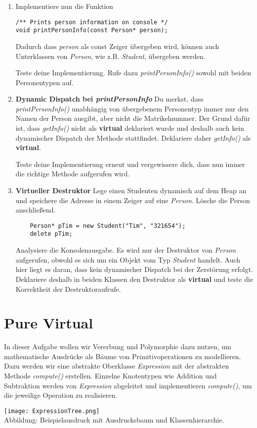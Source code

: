 \begin{enumerate}
\item
Implementiere nun die Funktion 
\begin{lstlisting}
/** Prints person information on console */
void printPersonInfo(const Person* person);
\end{lstlisting}

Dadurch dass \emph{person} als const Zeiger übergeben wird, können auch Unterklassen von \emph{Person}, wie z.B. \emph{Student}, übergeben werden. 

Teste deine Implementierung. 
Rufe dazu \emph{printPersonInfo()} sowohl mit beiden Personentypen auf.

\item \textbf{Dynamic Dispatch bei \emph{printPersonInfo}}
Du merkst, dass \emph{printPersonInfo()} unabhängig von übergebenem Personentyp immer nur den Namen der Person ausgibt, aber nicht die Matrikelnummer.
Der Grund dafür ist, dass \emph{getInfo()} nicht als \textbf{virtual} deklariert wurde und deshalb auch kein dynamischer Dispatch der Methode stattfindet.
Deklariere daher \emph{getInfo()} als \textbf{virtual}.

Teste deine Implementierung erneut und vergewissere dich, dass nun immer die richtige Methode aufgerufen wird.

\item \textbf{Virtueller Destruktor}
Lege einen Studenten dynamisch auf dem Heap an und speichere die Adresse  in einem Zeiger auf eine \emph{Person}.
Lösche die Person anschließend.
\begin{lstlisting}
	Person* pTim = new Student("Tim", "321654");
	delete pTim;
\end{lstlisting}

Analysiere die Konsolenausgabe.
Es wird nur der Destruktor von \emph{Person} aufgerufen, obwohl es sich um ein Objekt vom Typ \emph{Student} handelt.
Auch hier liegt es daran, dass kein dynamischer Dispatch bei der Zerstörung erfolgt.
Deklariere deshalb in beiden Klassen den Destruktor als \textbf{virtual} und teste die Korrektheit der Destruktoraufrufe.

\end{enumerate}


\section{Pure Virtual}
In dieser Aufgabe wollen wir Vererbung und Polymorphie dazu nutzen, um mathematische Ausdrücke als Bäume von Primitivoperationen zu modellieren.
Dazu werden wir eine abstrakte Oberklasse \emph{Expression} mit der abstrakten Methode \emph{compute()} erstellen.
Einzelne Knotentypen wie Addition und Subtraktion werden von \emph{Expression} abgeleitet und implementieren \emph{compute()}, um die jeweilige Operation zu realisieren.
\begin{center}
	\texttt{[image: ExpressionTree.png]}\\
	Abbildung: Beispielausdruck mit Ausdrucksbaum und Klassenhierarchie.
\end{center}

